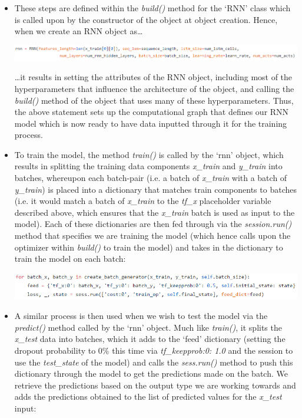 \documentclass[12pt,twoside]{report}
\begin{document}
\begin{itemize}
\begin{center}
\end{center}
	\item These steps are defined within the \textit{build()} method for the ‘RNN’ class which is called upon by the constructor of the object at object creation. Hence, when we create an RNN object as…
\begin{center}
\includegraphics[scale=0.5]{project_figures/fig3_15}
\end{center}
…it results in setting the attributes of the RNN object, including most of the hyperparameters that influence the architecture of the object, and calling the \textit{build()} method of the object that uses many of these hyperparameters. Thus, the above statement sets up the computational graph that defines our RNN model which is now ready to have data inputted through it for the training process.
	\item To train the model, the method \textit{train()} is called by the ‘rnn’ object, which results in splitting the training data components \textit{x\_train} and \textit{y\_train} into batches, whereupon each batch-pair (i.e. a batch of \textit{x\_train} with a batch of \textit{y\_train}) is placed into a dictionary that matches train components to batches (i.e. it would match a batch of \textit{x\_train} to the \textit{tf\_x} placeholder variable described above, which ensures that the \textit{x\_train} batch is used as input to the model). Each of these dictionaries are then fed through via the \textit{session.run()} method that specifies we are training the model (which hence calls upon the optimizer within \textit{build()} to train the model) and takes in the dictionary to train the model on each batch:
\begin{center}
\includegraphics[scale=0.6]{project_figures/fig3_16}
\end{center}
	\item A similar process is then used when we wish to test the model via the \textit{predict()} method called by the ‘rnn’ object. Much like \textit{train()}, it splits the \textit{x\_test} data into batches, which it adds to the ‘feed’ dictionary (setting the dropout probability to 0\% this time via \textit{tf\_keepprob:0: 1.0} and the session to use the \textit{test\_state} of the model) and calls the \textit{sess.run()} method to push this dictionary through the model to get the predictions made on the batch. We retrieve the predictions based on the output type we are working towards and adds the predictions obtained to the list of predicted values for the \textit{x\_test} input:

\end{itemize}
\end{document}
